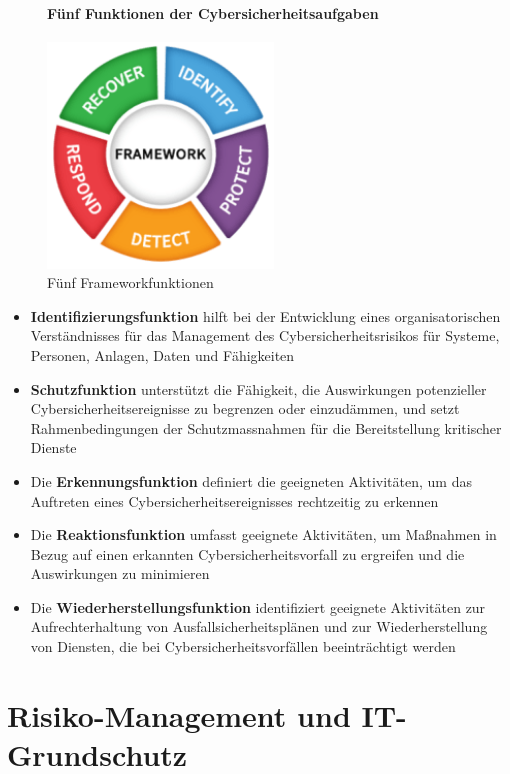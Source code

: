 \documentclass[10pt,a4paper]{article}
\begin{document}
\begin{figure}[H]
\paragraph*{Fünf Funktionen der Cybersicherheitsaufgaben}
    \begin{center}
    \includegraphics[width=6cm]{images/NISTfunctions.png}
    \caption{Fünf Frameworkfunktionen}
    \label{nistfunctions}
    \end{center}
\end{figure}
\begin{itemize}[noitemsep,topsep=0pt,leftmargin=*]
    \item \textbf{Identifizierungsfunktion} hilft bei der Entwicklung eines organisatorischen Verständnisses für das Management des Cybersicherheitsrisikos für Systeme, Personen, Anlagen, Daten und Fähigkeiten
    \item \textbf{Schutzfunktion} unterstützt die Fähigkeit, die Auswirkungen potenzieller Cybersicherheitsereignisse zu begrenzen oder einzudämmen, und setzt Rahmenbedingungen der Schutzmassnahmen für die Bereitstellung kritischer Dienste
    \item Die \textbf{Erkennungsfunktion} definiert die geeigneten Aktivitäten, um das Auftreten eines Cybersicherheitsereignisses rechtzeitig zu erkennen
    \item Die \textbf{Reaktionsfunktion} umfasst geeignete Aktivitäten, um Maßnahmen in Bezug auf einen erkannten Cybersicherheitsvorfall zu ergreifen und die Auswirkungen zu minimieren
    \item Die \textbf{Wiederherstellungsfunktion} identifiziert geeignete Aktivitäten zur Aufrechterhaltung von Ausfallsicherheitsplänen und zur Wiederherstellung von Diensten, die bei Cybersicherheitsvorfällen beeinträchtigt werden
\end{itemize}


\pagebreak
\section{Risiko-Management und IT-Grundschutz}
\end{document}
